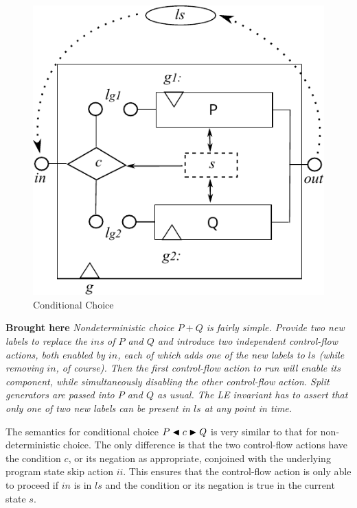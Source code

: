 \begin{figure}
  \centering
  \includegraphics{images/conditional-actual}
  \caption{Conditional Choice}
  \label{fig:conditional}
\end{figure}


\textbf{Brought here}
\emph{Nondeterministic choice $P+Q$ is fairly simple.
Provide two new labels to replace the $in$s of $P$ and $Q$
and introduce two independent control-flow actions,
both enabled by $in$, each of which adds one of the new labels to $ls$
(while removing $in$, of course).
Then the first control-flow action to run will enable its component,
while simultaneously disabling the other control-flow action.
Split generators are passed into $P$ and $Q$ as usual.
The LE invariant has to assert that only one of two new labels
can be present in $ls$ at any point in time.
}

The semantics for conditional choice $P \mathrel{\blacktriangleleft{c}\blacktriangleright} Q$
is very similar to that for non-deterministic choice.
The only difference is that the two control-flow actions
have the condition $c$, or its negation as appropriate,
conjoined with the underlying program state skip action $ii$.
This ensures that the control-flow action is only able to proceed
if $in$ is in $ls$ and the condition or its negation is true
in the current state $s$.


